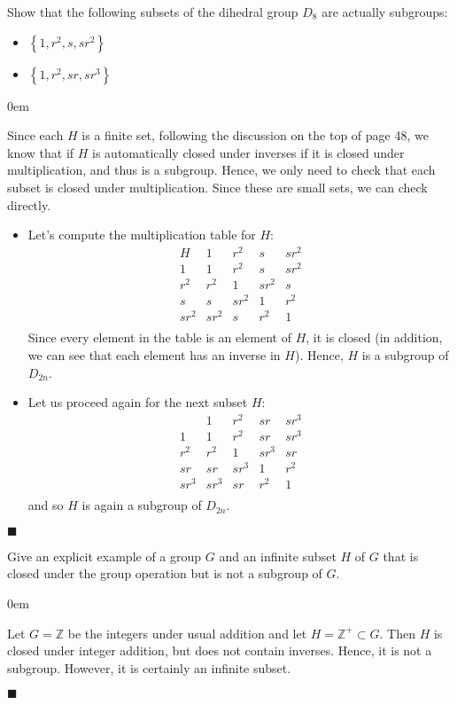 \documentclass[12pt]{article}
\renewcommand{\qed}{\hfill$\blacksquare$}
\renewenvironment{proof}{\begin{addmargin}[1em]{0em}\begin{newproof}}{\end{newproof}\end{addmargin}\qed}
\newenvironment{problem}[2][Exercise]{\begin{trivlist}
\item[\hskip \labelsep {\bfseries #1}\hskip \labelsep {\bfseries #2.}]}{\end{trivlist}}
\begin{document}
\begin{problem}{2.1.3}
Show that the following subsets of the dihedral group $D_8$ are actually subgroups:
\begin{itemize}
	\item $\left\{1,r^2,s,sr^2\right\}$
	\item $\left\{1,r^2,sr,sr^3\right\}$
\end{itemize}
\end{problem}
\begin{proof}
Since each $H$ is a finite set, following the discussion on the top of page 48, we know that if $H$ is automatically closed under inverses if it is closed under multiplication, and thus is a subgroup. Hence, we only need to check that each subset is closed under multiplication. Since these are small sets, we can check directly.
\begin{itemize}
	\item Let's compute the multiplication table for $H$: $$\begin{array}{c|cccc}
	H & 1 & r^2 & s & sr^2 \\ \hline
	1 & 1 & r^2 & s & sr^2 \\
	r^2 & r^2 & 1 & sr^2 & s \\
	s & s & sr^2 & 1 & r^2 \\
	sr^2 & sr^2 & s & r^2 & 1 \\
	\end{array} $$ Since every element in the table is an element of $H$, it is closed (in addition, we can see that each element has an inverse in $H$). Hence, $H$ is a subgroup of $D_{2n}$.
	\item Let us proceed again for the next subset $H$:
	$$ \begin{array}{c|cccc}
	& 1 & r^2 & sr & sr^3 \\ \hline
	1 & 1& r^2 & sr & sr^3 \\
	r^2 & r^2 & 1 & sr^3 & sr \\
	sr & sr & sr^3 & 1 & r^2 \\
	sr^3 & sr^3 & sr & r^2 & 1 \\
	\end{array}$$ and so $H$ is again a subgroup of $D_{2n}$.
\end{itemize}
\end{proof}




\begin{problem}{2.1.4}
Give an explicit example of a group $G$ and an infinite subset $H$ of $G$ that is closed under the group operation but is not a subgroup of $G$.
\end{problem}
\begin{proof}
Let $G= \mathbb{Z}$ be the integers under usual addition and let $H = \mathbb{Z}^+ \subset G$. Then $H$ is closed under integer addition, but does not contain inverses. Hence, it is not a subgroup. However, it is certainly an infinite subset.
\end{proof}
\end{document}
